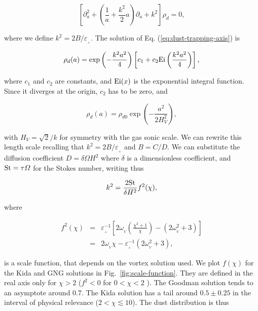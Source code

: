 \documentclass[apj]{emulateapj}
\newcommand{\Eq}[1]{Eq. (\ref{#1})}
\newcommand{\eq}[1]{\Eq{#1}}
\newcommand{\Fig}[1]{Fig.~\ref{#1}}
\newcommand{\fig}[1]{\Fig{#1}}
\newcommand{\beq}{\begin{equation}}
\newcommand{\eeq}{\end{equation}}
\newcommand{\beqn}{\begin{eqnarray}}
\newcommand{\eeqn}{\end{eqnarray}}
\newcommand{\epsp}{\varepsilon_{_{+}}}
\begin{document}
\beq\label{eq:dust-trapping-axis}
\left[\partial^2_a  +  \left(\frac{1}{a} +  \frac{k^2}{2}a\right) \partial_a  + k^2\right]\rho_d = 0, 
\eeq

\noindent where we define $k^2=2B/\epsp$. The solution of
\eq{eq:dust-trapping-axis} is 

\beq
\rho_d(a) = \exp\left(-\frac{k^2a^2}{4}\right)  \left[c_1 + c_2 {\rm
    Ei}\left(\frac{k^2a^2}{4}\right)\right],
\eeq

\noindent where $c_1$ and $c_2$ are constants, and ${\rm Ei}(x)$ is
the exponential integral function. Since it diverges at the origin, $c_2$ has to be zero, and 

\beq
\rho_d(a) = \rho_{d0} \exp\left(-\frac{a^2}{2H_V^2}\right),
\eeq

\noindent with $H_V = \sqrt{2}/k$ for symmetry with the gas sonic scale. We can 
rewrite this length scale recalling that $k^2=2B/\epsp$ and
$B=C/D$. We can substitute the diffusion coefficient $D=\delta \varOmega H^2$ where 
$\delta$ is a dimensionless coefficient, and ${\rm St} = \tau\varOmega$ for 
the Stokes number, writing thus 

\beqn
\label{eq:k}
k^2 = \frac{2{\rm St}}{\delta H^2} f^2(\chi),
\eeqn 

\noindent where 

\beqn
f^2(\chi) &=& \epsp^{-1} \left[2\omega_{_V}\left(\frac{\chi^2+1}{\chi}\right) - (2\omega_{_V}^2 + 3) \right]\nonumber \\
          &=& 2\omega_{_V}\chi - \epsp^{-1}(2\omega_{_V}^2 + 3),
\label{eq:scale-function}
\eeqn

\noindent is a scale function, that depends on the vortex solution
used. We plot $f(\chi)$ for the Kida and GNG solutions in
\fig{fig:scale-function}. They are defined in the real axis only for $\chi > 2$ ($f^2
< 0$ for $0 < \chi < 2$ ). The Goodman solution tends to an asymptote
around 0.7. The Kida solution has a  tail around $0.5\pm0.25$ in the
interval of physical relevance ($2 < \chi \lesssim 10$). The dust distribution is thus 
\end{document}

